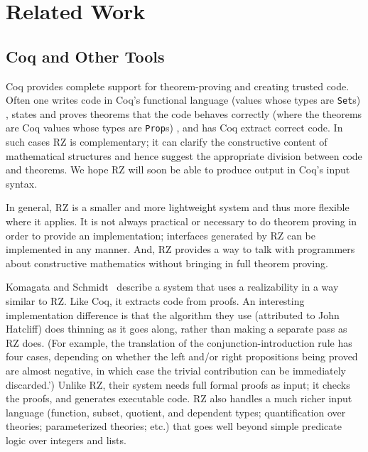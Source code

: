 \section{Related Work}
\label{sec:related-work}

\subsection{Coq and Other Tools}
\label{sec:comparison-with-coq}

Coq provides complete support for
theorem-proving and creating trusted code.  Often one
writes code in Coq's functional language%
\iflong 
(values whose types are \texttt{Set}s)
\fi %
, states and proves theorems
that the code behaves correctly%
\iflong
(where the theorems are Coq values whose types are \texttt{Prop}s)
\fi %
, and has Coq extract
correct code. In such cases RZ is complementary; it can
\iflong
clarify the constructive content of mathematical
structures and hence 
\fi %
suggest the appropriate division between code
and theorems. We hope RZ will soon be able to 
produce output in Coq's input syntax.

\iflong
In general, RZ is a smaller and more lightweight system and thus more
flexible where it applies. It is not always practical or necessary to
do theorem proving in order to provide an implementation; interfaces
generated by RZ can be implemented in any manner. And, RZ provides a way to talk with
programmers about constructive mathematics without bringing in
full theorem proving.
\fi %

Komagata and Schmidt~\cite{komagata+:tr95} describe a system that uses
a realizability in a way similar to RZ.  Like Coq, it extracts code from
proofs.
%
An interesting implementation difference is that  the algorithm
they use (attributed to John Hatcliff) does thinning as it goes along,
rather than making a separate pass as RZ does.
%
\iflong
(For example, the translation of the
conjunction-introduction rule has four cases, depending on whether the
left and/or right propositions being proved are almost negative, in
which case the trivial contribution can be immediately discarded.')
\fi
%
Unlike RZ, their system needs full formal proofs as input; it checks
the proofs, and generates executable code.  RZ also handles a much
richer input language (function, subset, quotient, and dependent
types; quantification over theories; parameterized theories; etc.)
that goes well beyond simple predicate logic over integers and lists.

